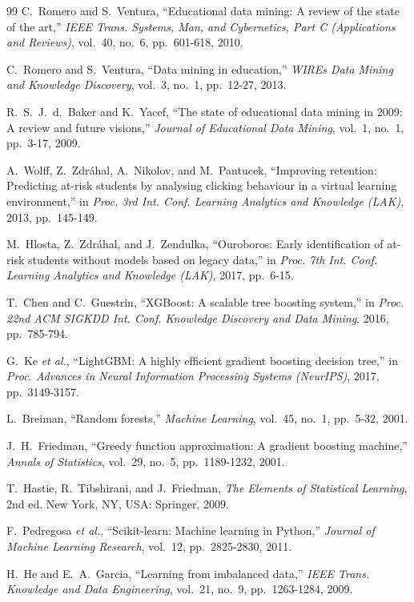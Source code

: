 \documentclass[conference]{IEEEtran}
\begin{document}
\begin{thebibliography}{99}
C.~Romero and S.~Ventura, ``Educational data mining: A review of the state
of the art,'' \emph{IEEE Trans. Systems, Man, and Cybernetics, Part C
(Applications and Reviews)}, vol.~40, no.~6, pp.~601-618, 2010.

C.~Romero and S.~Ventura, ``Data mining in education,'' \emph{WIREs Data
Mining and Knowledge Discovery}, vol.~3, no.~1, pp.~12-27, 2013.

R.~S.~J.~d.~Baker and K.~Yacef, ``The state of educational data mining in
2009: A review and future visions,'' \emph{Journal of Educational Data
Mining}, vol.~1, no.~1, pp.~3-17, 2009.

A.~Wolff, Z.~Zdr\'ahal, A.~Nikolov, and M.~Pantucek, ``Improving retention:
Predicting at-risk students by analysing clicking behaviour in a virtual
learning environment,'' in \emph{Proc. 3rd Int. Conf. Learning Analytics and
Knowledge (LAK)}, 2013, pp.~145-149.

M.~Hlosta, Z.~Zdr\'ahal, and J.~Zendulka, ``Ouroboros: Early identification
of at-risk students without models based on legacy data,'' in \emph{Proc.
7th Int. Conf. Learning Analytics and Knowledge (LAK)}, 2017, pp.~6-15.

T.~Chen and C.~Guestrin, ``XGBoost: A scalable tree boosting system,'' in
\emph{Proc. 22nd ACM SIGKDD Int. Conf. Knowledge Discovery and Data Mining},
2016, pp.~785-794.

G.~Ke \emph{et al.}, ``LightGBM: A highly efficient gradient boosting
decision tree,'' in \emph{Proc. Advances in Neural Information Processing
Systems (NeurIPS)}, 2017, pp.~3149-3157.

L.~Breiman, ``Random forests,'' \emph{Machine Learning}, vol.~45, no.~1,
pp.~5-32, 2001.

J.~H.~Friedman, ``Greedy function approximation: A gradient boosting
machine,'' \emph{Annals of Statistics}, vol.~29, no.~5, pp.~1189-1232, 2001.

T.~Hastie, R.~Tibshirani, and J.~Friedman, \emph{The Elements of Statistical
Learning}, 2nd ed. New York, NY, USA: Springer, 2009.

F.~Pedregosa \emph{et al.}, ``Scikit-learn: Machine learning in Python,''
\emph{Journal of Machine Learning Research}, vol.~12, pp.~2825-2830, 2011.

H.~He and E.~A.~Garcia, ``Learning from imbalanced data,'' \emph{IEEE Trans.
Knowledge and Data Engineering}, vol.~21, no.~9, pp.~1263-1284, 2009.


\end{thebibliography}
\end{document}
